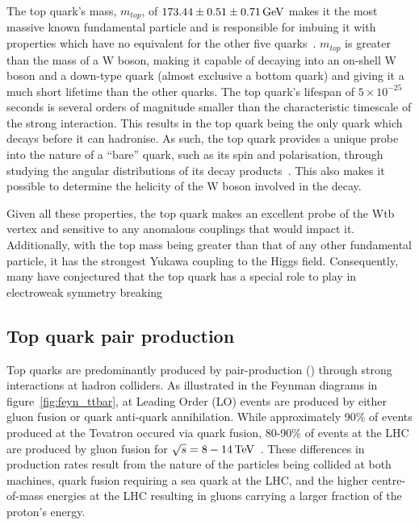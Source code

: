 The top quark's mass, $m_{top}$, of $173.44 \pm 0.51 \pm 0.71 \,\text{Ge\hspace{-.08em}V}$ makes it the most massive known fundamental particle and is responsible for imbuing it with properties which have no equivalent for the other five quarks~\cite{Patrignani:2016xqp}.
$m_{top}$ is greater than the mass of a W boson, making it capable of decaying into an on-shell W boson and a down-type quark (almost exclusive a bottom quark) and giving it a much short lifetime than the other quarks.
The top quark's lifespan of $5 \times 10^{-25}$ seconds is several orders of magnitude smaller than the characteristic timescale of the strong interaction.
This results in the top quark being the only quark which decays before it can hadronise. 
As such, the top quark provides a unique probe into the nature of a ``bare'' quark, such as its spin and polarisation, through studying the angular distributions of its decay products~\cite{Khachatryan:2015dzz}.
This also makes it possible to determine the helicity of the W boson involved in the decay.

Given all these properties, the top quark makes an excellent probe of the Wtb vertex and sensitive to any anomalous couplings that would impact it.
Additionally, with the top mass being greater than that of any other fundamental particle, it has the strongest Yukawa coupling to the Higgs field.
Consequently, many have conjectured that the top quark has a special role to play in electroweak symmetry breaking~\cite{Giammanco:2017xyn}
 

\subsection{Top quark pair production}\label{subsec:ttbarTheory}
Top quarks are predominantly produced by pair-production (\ttbar) through strong interactions at hadron colliders.
As illustrated in the Feynman diagrams in figure~\ref{fig:feyn_ttbar}, at Leading Order (LO) \ttbar events are produced by either gluon fusion or quark anti-quark annihilation. 
While approximately 90\% of \ttbar events produced at the Tevatron occured via quark fusion, 80-90\% of \ttbar events at the LHC are produced by gluon fusion for $\sqrt{s} = 8-14\,\text{Te\hspace{-.08em}V}$~\cite{Deliot:2011np,Patrignani:2016xqp}.
These differences in production rates result from the nature of the particles being collided at both machines, \ie quark fusion requiring a sea quark at the LHC, and the higher centre-of-mass energies at the LHC resulting in gluons carrying a larger fraction of the proton's energy.


